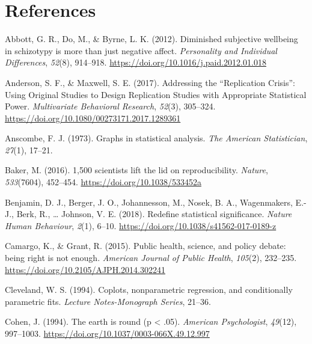 \documentclass[
  english,
  man]{apa6}
\newlength{\cslhangindent}
\newenvironment{cslreferences}%
  {\setlength{\parindent}{0pt}%
  \everypar{\setlength{\hangindent}{\cslhangindent}}\ignorespaces}%
  {\par}
\begin{document}
\newpage

\hypertarget{references}{%
\section{References}\label{references}}

\begingroup
\setlength{\parindent}{-0.5in}
\setlength{\leftskip}{0.5in}

\hypertarget{refs}{}
\begin{cslreferences}
\leavevmode\hypertarget{ref-Abbott2012}{}%
Abbott, G. R., Do, M., \& Byrne, L. K. (2012). Diminished subjective wellbeing in schizotypy is more than just negative affect. \emph{Personality and Individual Differences}, \emph{52}(8), 914--918. \url{https://doi.org/10.1016/j.paid.2012.01.018}

\leavevmode\hypertarget{ref-Anderson2017}{}%
Anderson, S. F., \& Maxwell, S. E. (2017). Addressing the ``Replication Crisis'': Using Original Studies to Design Replication Studies with Appropriate Statistical Power. \emph{Multivariate Behavioral Research}, \emph{52}(3), 305--324. \url{https://doi.org/10.1080/00273171.2017.1289361}

\leavevmode\hypertarget{ref-anscombe1973graphs}{}%
Anscombe, F. J. (1973). Graphs in statistical analysis. \emph{The American Statistician}, \emph{27}(1), 17--21.

\leavevmode\hypertarget{ref-Baker2016a}{}%
Baker, M. (2016). 1,500 scientists lift the lid on reproducibility. \emph{Nature}, \emph{533}(7604), 452--454. \url{https://doi.org/10.1038/533452a}

\leavevmode\hypertarget{ref-Benjamin2018}{}%
Benjamin, D. J., Berger, J. O., Johannesson, M., Nosek, B. A., Wagenmakers, E.-J., Berk, R., \ldots{} Johnson, V. E. (2018). Redefine statistical significance. \emph{Nature Human Behaviour}, \emph{2}(1), 6--10. \url{https://doi.org/10.1038/s41562-017-0189-z}

\leavevmode\hypertarget{ref-Camargo2015}{}%
Camargo, K., \& Grant, R. (2015). Public health, science, and policy debate: being right is not enough. \emph{American Journal of Public Health}, \emph{105}(2), 232--235. \url{https://doi.org/10.2105/AJPH.2014.302241}

\leavevmode\hypertarget{ref-Cleveland1994}{}%
Cleveland, W. S. (1994). Coplots, nonparametric regression, and conditionally parametric fits. \emph{Lecture Notes-Monograph Series}, 21--36.

\leavevmode\hypertarget{ref-cohen_earth_1994}{}%
Cohen, J. (1994). The earth is round (p \textless{} .05). \emph{American Psychologist}, \emph{49}(12), 997--1003. \url{https://doi.org/10.1037/0003-066X.49.12.997}


\end{cslreferences}
\end{document}
